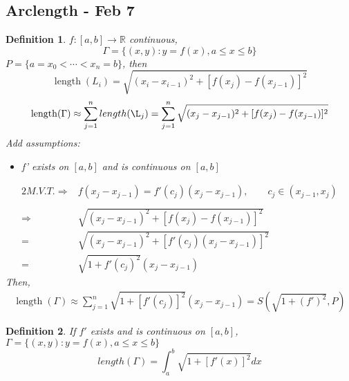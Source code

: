 \documentclass[12pt]{article}
\theoremstyle{plain}
\newtheorem{definition}{Definition}[subsection]
\newcommand{\mR}{{\mathbb{R}}}
\DeclareMathOperator{\Length}{length}
\begin{document}
{%
}


\newpage
\subsection{Arclength - Feb 7}
\begin{definition}
	$f:[a,b]\to \mR$ continuous,
	\[
		\Gamma = \{(x,y): y = f(x), a\leq x \leq b\}
	\]
	$P = \{a = x_0 < \cdots < x_n = b\}$, then 
	\[
		\Length(L_i) = \sqrt{(x_i-x_{i-1})^2 + [f(x_j)-f(x_{j-1})]^2}
	\]
	\[
		\Length(\Gamma) \approx \sum_{j=1}^n length(\L_j) 
		=\sum_{j=1}^n \sqrt{(x_j-x_{j-1})^2 + [f(x_j)-f(x_{j-1})]^2}
	\]
	Add assumptions: 
	\begin{itemize}
		\item f' exists on $[a,b]$ and is continuous on $[a,b]$
	\end{itemize}
	
	\begin{alignat*}{2} 
		M.V.T.
		\Rightarrow &f(x_j-x_{j-1}) = f'(c_j) (x_j-x_{j-1}), \qquad
		c_j\in (x_{j-1}, x_j)\\\\
		\Rightarrow &\sqrt{(x_j-x_{j-1})^2 + [f(x_j)-f(x_{j-1})]^2}\\
			=& \sqrt{(x_j-x_{j-1})^2 + [f'(c_j)(x_j-x_{j-1})]^2}\\
			=& \sqrt{1+f'(c_j)^2}(x_j-x_{j-1})
	\end{alignat*}
	Then, 
	\begin{align*}
		\Length(\Gamma) \approx \sum_{j=1}^n \sqrt{1+[f'(c_j)]^2}
		(x_j-x_{j-1})= S(\sqrt{1+(f')^2}, P)
	\end{align*}
\end{definition}

\begin{definition}
	If $f'$ exists and is continuous on $[a,b]$, $\Gamma = \{(x,y):
	y= f(x), a\leq x \leq b\}$
	\[
		length(\Gamma) = \int_a^b \sqrt{1+[f'(x)]^2}dx
	\]
\end{definition}
\end{document}
